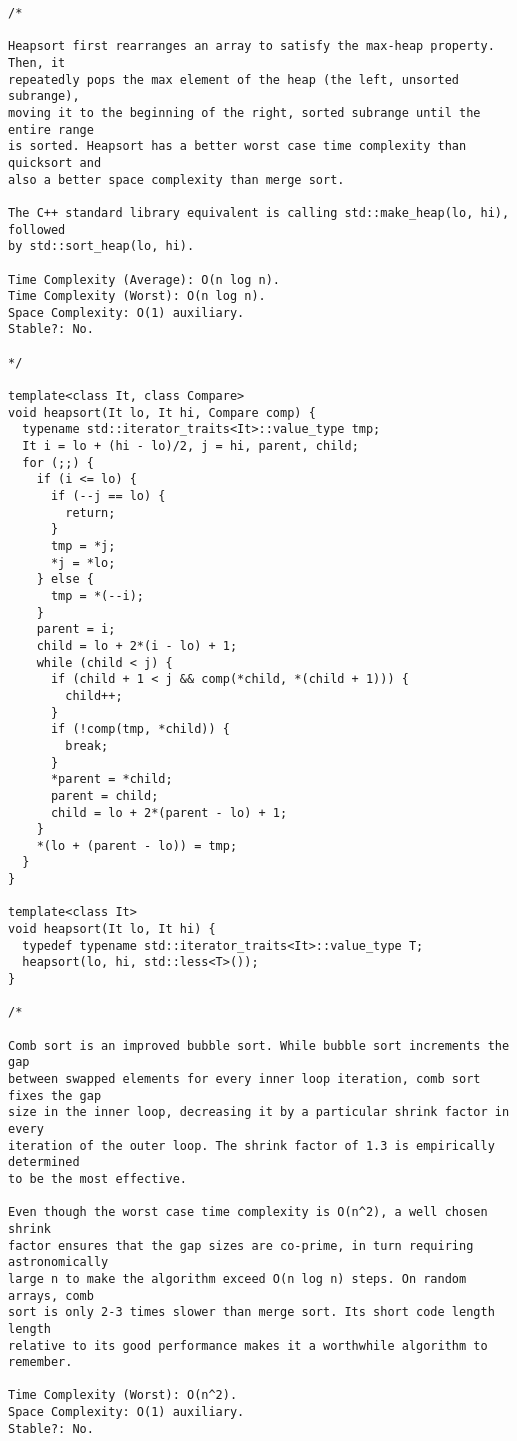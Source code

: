 \begin{lstlisting}
/*

Heapsort first rearranges an array to satisfy the max-heap property. Then, it
repeatedly pops the max element of the heap (the left, unsorted subrange),
moving it to the beginning of the right, sorted subrange until the entire range
is sorted. Heapsort has a better worst case time complexity than quicksort and
also a better space complexity than merge sort.

The C++ standard library equivalent is calling std::make_heap(lo, hi), followed
by std::sort_heap(lo, hi).

Time Complexity (Average): O(n log n).
Time Complexity (Worst): O(n log n).
Space Complexity: O(1) auxiliary.
Stable?: No.

*/

template<class It, class Compare>
void heapsort(It lo, It hi, Compare comp) {
  typename std::iterator_traits<It>::value_type tmp;
  It i = lo + (hi - lo)/2, j = hi, parent, child;
  for (;;) {
    if (i <= lo) {
      if (--j == lo) {
        return;
      }
      tmp = *j;
      *j = *lo;
    } else {
      tmp = *(--i);
    }
    parent = i;
    child = lo + 2*(i - lo) + 1;
    while (child < j) {
      if (child + 1 < j && comp(*child, *(child + 1))) {
        child++;
      }
      if (!comp(tmp, *child)) {
        break;
      }
      *parent = *child;
      parent = child;
      child = lo + 2*(parent - lo) + 1;
    }
    *(lo + (parent - lo)) = tmp;
  }
}

template<class It>
void heapsort(It lo, It hi) {
  typedef typename std::iterator_traits<It>::value_type T;
  heapsort(lo, hi, std::less<T>());
}

/*

Comb sort is an improved bubble sort. While bubble sort increments the gap
between swapped elements for every inner loop iteration, comb sort fixes the gap
size in the inner loop, decreasing it by a particular shrink factor in every
iteration of the outer loop. The shrink factor of 1.3 is empirically determined
to be the most effective.

Even though the worst case time complexity is O(n^2), a well chosen shrink
factor ensures that the gap sizes are co-prime, in turn requiring astronomically
large n to make the algorithm exceed O(n log n) steps. On random arrays, comb
sort is only 2-3 times slower than merge sort. Its short code length length
relative to its good performance makes it a worthwhile algorithm to remember.

Time Complexity (Worst): O(n^2).
Space Complexity: O(1) auxiliary.
Stable?: No.


\end{lstlisting}
